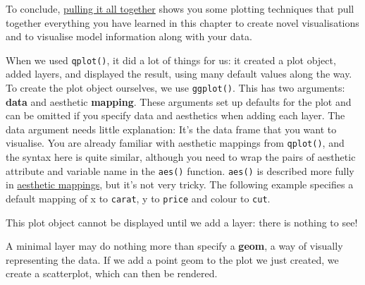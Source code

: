 To conclude, \hyperref[sec:pull-together]{pulling it all together} shows
you some plotting techniques that pull together everything you have
learned in this chapter to create novel visualisations and to visualise
model information along with your data.


When we used \texttt{qplot()}, it did a lot of things for us: it created
a plot object, added layers, and displayed the result, using many
default values along the way. To create the plot object ourselves, we
use \texttt{ggplot()}. This has two arguments: \textbf{data} and
aesthetic \textbf{mapping}. These arguments set up defaults for the plot
and can be omitted if you specify data and aesthetics when adding each
layer. The data argument needs little explanation: It's the data frame
that you want to visualise. You are already familiar with aesthetic
mappings from \texttt{qplot()}, and the syntax here is quite similar,
although you need to wrap the pairs of aesthetic attribute and variable
name in the \texttt{aes()} function. \texttt{aes()} is described more
fully in \hyperref[sec:aes]{aesthetic mappings}, but it's not very
tricky. The following example specifies a default mapping of x to
\texttt{carat}, y to \texttt{price} and colour to \texttt{cut}.

\begin{Shaded}
\begin{Highlighting}[]
\StringTok{ } 
\end{Highlighting}
\end{Shaded}

This plot object cannot be displayed until we add a layer: there is
nothing to see!


A minimal layer may do nothing more than specify a \textbf{geom}, a way
of visually representing the data. If we add a point geom to the plot we
just created, we create a scatterplot, which can then be rendered.

